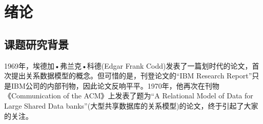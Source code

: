 \documentclass{zjutthesis}
\begin{document}



\frontmatter



\tableofcontents           %
\listoffigures             %
\listoftables              %


\mainmatter



\chapter{绪论}
\section{课题研究背景}
1969年，埃德加•弗兰克•科德(Edgar Frank Codd)发表了一篇划时代的论文，首次提出关系数据模型的概念。但可惜的是，刊登论文的“IBM Research Report”只是IBM公司的内部刊物，因此论文反响平平。1970年，他再次在刊物《Communication of the ACM》上发表了题为“A Relational Model of Data for Large Shared Data banks”(大型共享数据库的关系模型)的论文，终于引起了大家的关注。
\end{document}
